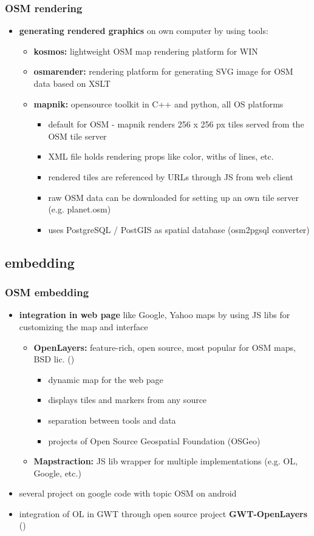 \documentclass[blue]{beamer}
\begin{document}
\frame
{
\frametitle{\textbf{OSM rendering}}
\begin{itemize}
\item \textbf{generating rendered graphics} on own computer by using tools:
	\begin{itemize}
			\item \textbf{kosmos:} lightweight OSM map rendering platform for WIN
			\item \textbf{osmarender:} rendering platform for generating SVG image for OSM data based on XSLT
			\item \textbf{mapnik:} opensource toolkit in C++ and python, all OS platforms
			\begin{itemize}
				\item default for OSM - mapnik renders 256 x 256 px tiles served from the OSM tile server
				\item XML file holds rendering props like color, withs of lines, etc.
				\item rendered tiles are referenced by URLs through JS from web client
				\item raw OSM data can be downloaded for setting up an own tile server (e.g. planet.osm)
				\item uses PostgreSQL / PostGIS as spatial database (osm2pgsql converter)
		\end{itemize}
	\end{itemize}
\end{itemize}
}

\subsection{embedding}
\frame
{
\frametitle{\textbf{OSM embedding}}
\begin{itemize}
	\item \textbf{integration in web page} like Google, Yahoo maps by using JS libs for customizing the map and interface
	\begin{itemize}
		\item \textbf{OpenLayers:} feature-rich, open source, most popular for OSM maps, BSD lic. ()
		\begin{itemize}
			\item dynamic map for the web page
			\item displays tiles and markers from any source
			\item separation between tools and data
			\item projects of Open Source Geospatial Foundation (OSGeo)
		\end{itemize}
		\item \textbf{Mapstraction:} JS lib wrapper for multiple implementations (e.g. OL, Google, etc.)
	\end{itemize}
	\item several project on google code with topic OSM on android
	\item integration of OL in GWT through open source project \textbf{GWT-OpenLayers} ()
\end{itemize}
}
\end{document}
